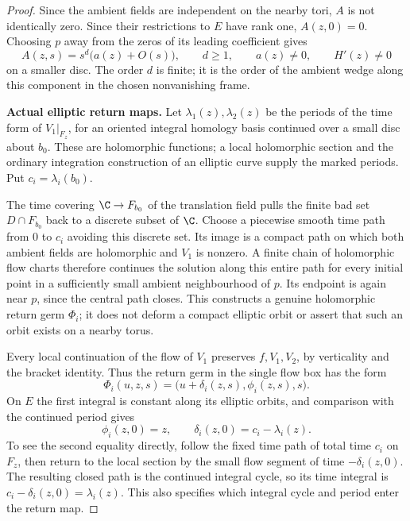 \begin{proof}
Since the ambient fields are independent on the nearby
tori, $A$ is not identically zero. Since their restrictions
to $E$ have rank one, $A(z,0)=0$. Choosing $p$ away
from the zeros of its leading coefficient gives
\[
 A(z,s)=s^d\bigl(a(z)+O(s)\bigr),\qquad d\ge1,
 \qquad a(z)\ne0,\qquad H'(z)\ne0
                                                               \tag{C.RG.5}
\]
on a smaller disc. The order $d$ is finite; it is the
order of the ambient wedge along this component in the
chosen nonvanishing frame.

\par\medskip\noindent\textbf{Actual elliptic return maps.}
Let $\lambda_1(z),\lambda_2(z)$ be the periods of the
time form of $V_1|_{F_z}$, for an oriented integral
homology basis continued over a small disc about $b_0$.
These are holomorphic functions; a local holomorphic
section and the ordinary integration construction of
an elliptic curve supply the marked periods. Put
$c_i=\lambda_i(b_0)$.

The time covering $\C\to F_{b_0}$ of the translation
field pulls the finite bad set $D\cap F_{b_0}$ back to
a discrete subset of $\C$. Choose a piecewise smooth
time path from $0$ to $c_i$ avoiding this discrete set.
Its image is a compact path on which both ambient fields
are holomorphic and $V_1$ is nonzero. A finite chain of
holomorphic flow charts therefore continues the solution
along this entire path for every initial point in a
sufficiently small ambient neighbourhood of $p$.
Its endpoint is again near $p$, since the central path
closes. This constructs a genuine holomorphic return
germ $\Phi_i$; it does not deform a compact elliptic
orbit or assert that such an orbit exists on a nearby
torus.

Every local continuation of the flow of $V_1$ preserves
$f,V_1,V_2$, by verticality and the bracket identity.
Thus the return germ in the single flow box has the form
\[
 \Phi_i(u,z,s)=\bigl(u+\delta_i(z,s),\phi_i(z,s),s\bigr).
                                                               \tag{C.RG.6}
\]
On $E$ the first integral is constant along its elliptic
orbits, and comparison with the continued period gives
\[
 \phi_i(z,0)=z,\qquad
 \delta_i(z,0)=c_i-\lambda_i(z).
                                                               \tag{C.RG.7}
\]
To see the second equality directly, follow the fixed
time path of total time $c_i$ on $F_z$, then return
to the local section by the small flow segment of
time $-\delta_i(z,0)$. The resulting closed path is
the continued integral cycle, so its time integral is
$c_i-\delta_i(z,0)=\lambda_i(z)$. This also specifies
which integral cycle and period enter the return map.


\end{proof}
